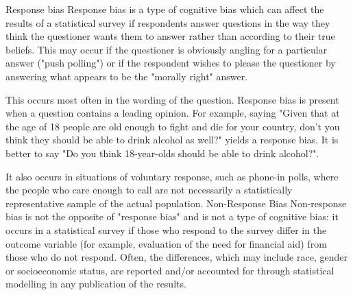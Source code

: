 Response bias
Response bias is a type of cognitive bias which can affect the results of a statistical survey if respondents answer questions in the way they think the questioner wants them to answer rather than according to their true beliefs. This may occur if the questioner is obviously angling for a particular answer ("push polling") or if the respondent wishes to please the questioner by answering what appears to be the "morally right" answer.
 
This occurs most often in the wording of the question. Response bias is present when a question contains a leading opinion. For example, saying "Given that at the age of 18 people are old enough to fight and die for your country, don't you think they should be able to drink alcohol as well?" yields a response bias. It is better to say "Do you think 18-year-olds should be able to drink alcohol?".
 
It also occurs in situations of voluntary response, such as phone-in polls, where the people who care enough to call are not necessarily a statistically representative sample of the actual population.
Non-Response Bias
Non-response bias is not the opposite of "response bias" and is not a type of cognitive bias: it occurs in a statistical survey if those who respond to the survey differ in the outcome variable (for example, evaluation of the need for financial aid) from those who do not respond. Often, the differences, which may include race, gender or socioeconomic status, are reported and/or accounted for through statistical modelling in any publication of the results.

